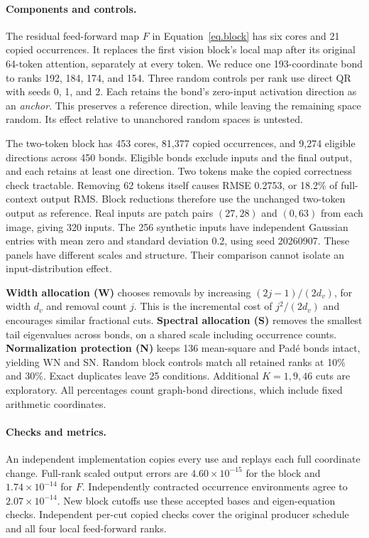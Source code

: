 \documentclass{article}
\begin{document}
\paragraph{Components and controls.}
The residual feed-forward map $F$ in Equation~\ref{eq.block} has six cores and 21 copied occurrences. It replaces the first vision block's local map after its original 64-token attention, separately at every token. We reduce one 193-coordinate bond to ranks 192, 184, 174, and 154. Three random controls per rank use direct QR with seeds 0, 1, and 2. Each retains the bond's zero-input activation direction as an \emph{anchor}. This preserves a reference direction, while leaving the remaining space random. Its effect relative to unanchored random spaces is untested.

The two-token block has 453 cores, 81,377 copied occurrences, and 9,274 eligible directions across 450 bonds. Eligible bonds exclude inputs and the final output, and each retains at least one direction. Two tokens make the copied correctness check tractable. Removing 62 tokens itself causes RMSE 0.2753, or 18.2\% of full-context output RMS. Block reductions therefore use the unchanged two-token output as reference. Real inputs are patch pairs $(27,28)$ and $(0,63)$ from each image, giving 320 inputs. The 256 synthetic inputs have independent Gaussian entries with mean zero and standard deviation 0.2, using seed 20260907. These panels have different scales and structure. Their comparison cannot isolate an input-distribution effect.

\textbf{Width allocation (W)} chooses removals by increasing $(2j-1)/(2d_v)$, for width $d_v$ and removal count $j$. This is the incremental cost of $j^2/(2d_v)$ and encourages similar fractional cuts. \textbf{Spectral allocation (S)} removes the smallest tail eigenvalues across bonds, on a shared scale including occurrence counts. \textbf{Normalization protection (N)} keeps 136 mean-square and Pad\'e bonds intact, yielding WN and SN. Random block controls match all retained ranks at 10\% and 30\%. Exact duplicates leave 25 conditions. Additional $K=1,9,46$ cuts are exploratory. All percentages count graph-bond directions, which include fixed arithmetic coordinates.

\paragraph{Checks and metrics.}
An independent implementation copies every use and replays each full coordinate change. Full-rank scaled output errors are $4.60\times10^{-15}$ for the block and $1.74\times10^{-14}$ for $F$. Independently contracted occurrence environments agree to $2.07\times10^{-14}$. New block cutoffs use these accepted bases and eigen-equation checks. Independent per-cut copied checks cover the original producer schedule and all four local feed-forward ranks.
\end{document}
